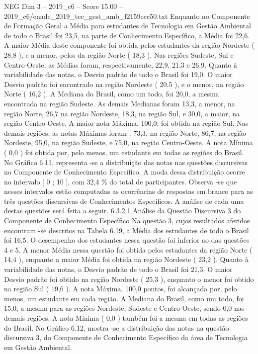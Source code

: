 \begin{textsample}{NEG Dim 3 – 2019\_c6 – Score 15.00 – 2019\_c6/enade\_2019\_tec\_gest\_amb\_f2159ecc50.txt}
Enquanto no Componente de Formação Geral a Média para estudantes de Tecnologia em Gestão Ambiental de todo o Brasil foi 23,5, na parte de Conhecimento Específico, a Média foi 22,6.
A maior Média deste componente foi obtida pelos estudantes da região Nordeste ( 28,8 ), e a menor, pelos da região Norte ( 18,3 ).
Nas regiões Sudeste, Sul e Centro-Oeste, as Médias foram, respectivamente, 22,9, 21,3 e 26,9.
Quanto à variabilidade das notas, o Desvio padrão de todo o Brasil foi 19,0.
O maior Desvio padrão foi encontrado na região Nordeste ( 20,5 ), e o menor, na região Norte ( 16,2 ).
A Mediana do Brasil, como um todo, foi 20,0, a mesma encontrada na região Sudeste.
As demais Medianas foram 13,3, a menor, na região Norte, 26,7 na região Nordeste, 18,3, na região Sul, e 30,0, a maior, na região Centro-Oeste.
A maior nota Máxima, 100,0, foi obtida na região Sul.
Nas demais regiões, as notas Máximas foram : 73,3, na região Norte, 86,7, na região Nordeste, 95,0, na região Sudeste, e 75,0, na região Centro-Oeste.
A nota Mínima ( 0,0 ) foi obtida por, pelo menos, um estudante em todas as regiões do Brasil.
No Gráfico 6.11, representa -se a distribuição das notas nas questões discursivas no Componente de Conhecimento Específico.
A moda dessa distribuição ocorre no intervalo [ 0 ; 10 ], com 32,4 \% do total de participantes.
Observa -se que nesses intervalos estão computadas as ocorrências de respostas em branco para as três questões discursivas de Conhecimentos Específicos.
A análise de cada uma destas questões será feita a seguir. 6.3.2.1 Análise da Questão Discursiva 3 do Componente de Conhecimento Específico Na questão 3, cujos resultados aferidos encontram -se descritos na Tabela 6.19, a Média dos estudantes de todo o Brasil foi 16,5.
O desempenho dos estudantes nessa questão foi inferior ao das questões 4 e 5.
A menor Média nessa questão foi obtida pelos estudantes da região Norte ( 14,4 ), enquanto a maior Média foi obtida na região Nordeste ( 23,2 ).
Quanto à variabilidade das notas, o Desvio padrão de todo o Brasil foi 21,3.
O maior Desvio padrão foi obtido na região Nordeste ( 25,3 ), enquanto o menor foi obtido na região Sul ( 19,6 ).
A nota Máxima, 100,0 pontos, foi alcançada por, pelo menos, um estudante em cada região.
A Mediana do Brasil, como um todo, foi 15,0, a mesma para as regiões Nordeste, Sudeste e Centro-Oeste, sendo 0,0 nas demais regiões.
A nota Mínima ( 0,0 ) também foi a mesma em todas as regiões do Brasil.
No Gráfico 6.12, mostra -se a distribuição das notas na questão discursiva 3, do Componente de Conhecimento Específico da área de Tecnologia em Gestão Ambiental.

\end{textsample}
